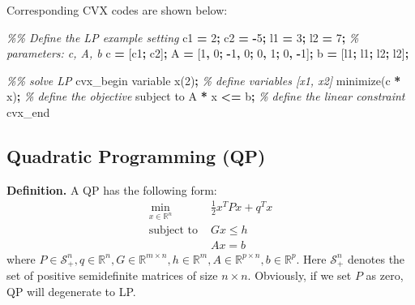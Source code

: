 \documentclass[
]{book}
\newenvironment{Shaded}{\begin{snugshade}}{\end{snugshade}}
\newcommand{\CommentTok}[1]{\textcolor[rgb]{0.56,0.35,0.01}{\textit{#1}}}
\newcommand{\FloatTok}[1]{\textcolor[rgb]{0.00,0.00,0.81}{#1}}
\newcommand{\NormalTok}[1]{#1}
\newcommand{\OperatorTok}[1]{\textcolor[rgb]{0.81,0.36,0.00}{\textbf{#1}}}
\newcommand{\VariableTok}[1]{\textcolor[rgb]{0.00,0.00,0.00}{#1}}
\theoremstyle{definition}
\theoremstyle{definition}
\theoremstyle{definition}
\theoremstyle{definition}
\theoremstyle{remark}
\begin{document}
Corresponding CVX codes are shown below:

\begin{Shaded}
\begin{Highlighting}[]
\CommentTok{\%\% Define the LP example setting}
\VariableTok{c1} \OperatorTok{=} \FloatTok{2}\OperatorTok{;}
\VariableTok{c2} \OperatorTok{=} \OperatorTok{{-}}\FloatTok{5}\OperatorTok{;}
\VariableTok{l1} \OperatorTok{=} \FloatTok{3}\OperatorTok{;}
\VariableTok{l2} \OperatorTok{=} \FloatTok{7}\OperatorTok{;}
\CommentTok{\% parameters: c, A, b}
\VariableTok{c} \OperatorTok{=}\NormalTok{ [}\VariableTok{c1}\OperatorTok{;} \VariableTok{c2}\NormalTok{]}\OperatorTok{;}
\VariableTok{A} \OperatorTok{=}\NormalTok{ [}\FloatTok{1}\OperatorTok{,} \FloatTok{0}\OperatorTok{;} \OperatorTok{{-}}\FloatTok{1}\OperatorTok{,} \FloatTok{0}\OperatorTok{;} \FloatTok{0}\OperatorTok{,} \FloatTok{1}\OperatorTok{;} \FloatTok{0}\OperatorTok{,} \OperatorTok{{-}}\FloatTok{1}\NormalTok{]}\OperatorTok{;}
\VariableTok{b} \OperatorTok{=}\NormalTok{ [}\VariableTok{l1}\OperatorTok{;} \VariableTok{l1}\OperatorTok{;} \VariableTok{l2}\OperatorTok{;} \VariableTok{l2}\NormalTok{]}\OperatorTok{;}

\CommentTok{\%\% solve LP}
\VariableTok{cvx\_begin}
    \VariableTok{variable} \VariableTok{x}\NormalTok{(}\FloatTok{2}\NormalTok{)}\OperatorTok{;} \CommentTok{\% define variables [x1, x2]}
    \VariableTok{minimize}\NormalTok{(}\VariableTok{c}\OperatorTok{\textquotesingle{}} \OperatorTok{*} \VariableTok{x}\NormalTok{)}\OperatorTok{;} \CommentTok{\% define the objective}
    \VariableTok{subject} \VariableTok{to}
        \VariableTok{A} \OperatorTok{*} \VariableTok{x} \OperatorTok{\textless{}=} \VariableTok{b}\OperatorTok{;} \CommentTok{\% define the linear constraint}
\VariableTok{cvx\_end}
\end{Highlighting}
\end{Shaded}

\subsection{Quadratic Programming (QP)}\label{quadratic-programming-qp}

\textbf{Definition.} A QP has the following form:
\begin{align}
   \label{eq:app-qpdef}
   \min_{x \in \mathbb{R}^n} \ & \frac{1}{2} x^T P x + q^T x \\
   \text{subject to } & Gx \le h \\
   & Ax = b
\end{align}
where \(P \in \mathcal{S}_+^n, q\in \mathbb{R}^n, G \in \mathbb{R}^{m \times n}, h\in \mathbb{R}^m, A \in \mathbb{R}^{p \times n}, b \in \mathbb{R}^p\). Here \(\mathcal{S}_+^n\) denotes the set of positive semidefinite matrices of size \(n\times n\). Obviously, if we set \(P\) as zero, QP will degenerate to LP.
\end{document}
